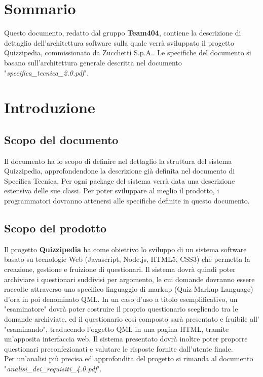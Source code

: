 \documentclass[a4paper,11pt]{article}
\begin{document}
	\fineregistro

	\newpage
	\fancyhead[R]{\leftmark}
	\tableofcontents
	\newpage
	\listoffigures
	\listoftables
	
	\newpage
	
	\section*{Sommario}
	Questo documento, redatto dal gruppo \textbf{Team404}, contiene la descrizione di dettaglio dell'architettura software sulla quale verrà sviluppato il progetto Quizzipedia, commissionato da Zucchetti S.p.A..
Le specifiche del documento si basano sull'architettura generale descritta nel documento "\textit{specifica\_tecnica\_2.0.pdf}".
	
	\newpage
	\section{Introduzione}
	\subsection{Scopo del documento}
	Il documento ha lo scopo di definire nel dettaglio la struttura del sistema Quizzipedia, approfondendone la descrizione già definita nel documento di Specifica Tecnica. Per ogni package del sistema verrà data una descrizione estensiva delle sue classi. Per poter sviluppare al meglio il prodotto, i programmatori dovranno attenersi alle specifiche definite in questo documento.
	
	\subsection{Scopo del prodotto}
	Il progetto \textbf{Quizzipedia} ha come obiettivo lo sviluppo di un sistema software basato su tecnologie Web (Javascript\addglos, Node.js\addglos, HTML5\addglos, CSS3\addglos) che permetta la creazione, gestione e fruizione di questionari. Il sistema dovrà quindi poter archiviare i questionari suddivisi per argomento, le cui domande dovranno essere raccolte attraverso uno specifico linguaggio di markup (Quiz Markup Language) d'ora in poi denominato QML\addglos. In un caso d'uso a titolo esemplificativo, un "esaminatore" dovrà poter costruire il proprio questionario scegliendo tra le domande archiviate, ed il questionario così composto sarà presentato e fruibile all' "esaminando", traducendo l'oggetto QML in una pagina HTML\addglos, tramite un'apposita interfaccia web. Il sistema presentato dovrà inoltre poter proporre questionari preconfezionati e valutare le risposte fornite dall'utente finale.
	\\
	Per un'analisi più precisa ed approfondita del progetto si rimanda al documento\\ "\textit{analisi\_dei\_requisiti\_4.0.pdf}".
\end{document}
